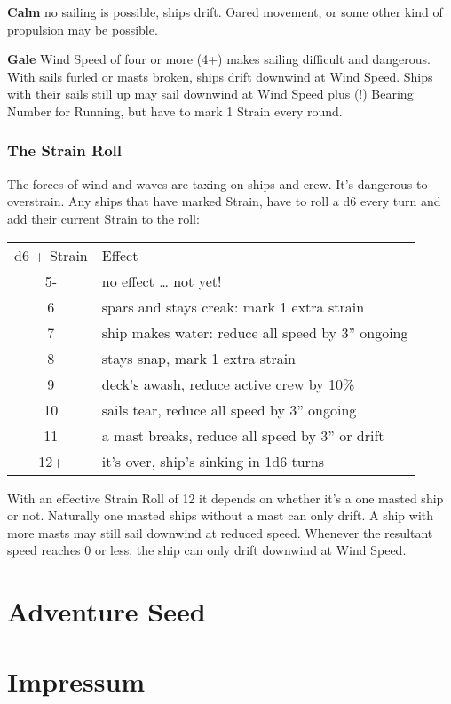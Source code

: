 \documentclass[11pt]{wbzine}
\begin{document}
\begin{multicols}{2}
\textbf{Calm} no sailing is possible, ships drift. Oared movement, or
some other kind of propulsion may be possible.

\textbf{Gale} Wind Speed of four or more (4+) makes sailing difficult
and dangerous. With sails furled or masts broken, ships drift downwind
at Wind Speed. Ships with their sails still up may sail downwind at Wind
Speed plus (!) Bearing Number for Running, but have to mark 1 Strain
every round.

\subsubsection{The Strain Roll}

The forces of wind and waves are taxing on ships and crew. It's
dangerous to overstrain. Any ships that have marked Strain, have to roll
a d6 every turn and add their current Strain to the roll:

\begin{tabularx}{\columnwidth}{cZ}
d6 + Strain & Effect \\
5- & no effect \ldots{} not yet! \\
6 & spars and stays creak: mark 1 extra strain \\
7 & ship makes water: reduce all speed by 3'' ongoing \\
8 & stays snap, mark 1 extra strain \\
9 & deck's awash, reduce active crew by 10\% \\
10 & sails tear, reduce all speed by 3'' ongoing \\
11 & a mast breaks, reduce all speed by 3'' or drift \\
12+ & it's over, ship's sinking in 1d6 turns \\
\end{tabularx}

With an effective Strain Roll of 12 it depends on whether it's a one
masted ship or not. Naturally one masted ships without a mast can only
drift. A ship with more masts may still sail downwind at reduced speed.
Whenever the resultant speed reaches 0 or less, the ship can only drift
downwind at Wind Speed.


\section{Adventure Seed}

\end{multicols}

\section{Impressum}
\end{document}
